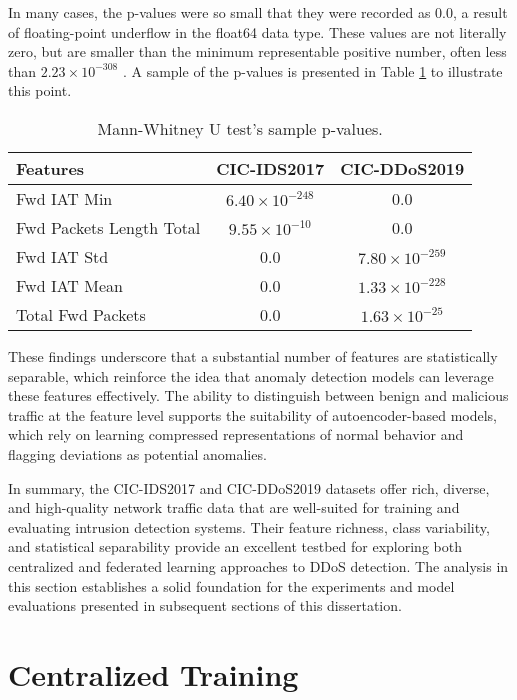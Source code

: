 In many cases, the p-values were so small that they were recorded as 0.0, a result of floating-point underflow in the float64 data type. These values are not literally zero, but are smaller than the minimum representable positive number, often less than $2.23 \times 10^{-308}$ \citep{w3floatnum}. A sample of the p-values is presented in Table \ref{tbl:mannwhitneyu_results} to illustrate this point.

\begin{table}[h]
    \caption{Mann-Whitney U test’s sample p-values.}
    \centering
    \begin{tabular}{l|c|c}
        Features & CIC-IDS2017 & CIC-DDoS2019 \\
        \hline\hline
        Fwd IAT Min  & $6.40 \times 10^{-248}$ & 0.0 \\
        Fwd Packets Length Total  & $9.55 \times 10^{-10}$ & 0.0 \\
        Fwd IAT Std  & 0.0 & $7.80 \times 10^{-259}$ \\
        Fwd IAT Mean  & 0.0 & $1.33 \times 10^{-228}$ \\
        Total Fwd Packets  & 0.0 & $1.63 \times 10^{-25}$ \\
    \end{tabular}
    \label{tbl:mannwhitneyu_results}
\end{table}

These findings underscore that a substantial number of features are statistically separable, which reinforce the idea that anomaly detection models can leverage these features effectively. The ability to distinguish between benign and malicious traffic at the feature level supports the suitability of autoencoder-based models, which rely on learning compressed representations of normal behavior and flagging deviations as potential anomalies.

In summary, the CIC-IDS2017 and CIC-DDoS2019 datasets offer rich, diverse, and high-quality network traffic data that are well-suited for training and evaluating intrusion detection systems. Their feature richness, class variability, and statistical separability provide an excellent testbed for exploring both centralized and federated learning approaches to DDoS detection. The analysis in this section establishes a solid foundation for the experiments and model evaluations presented in subsequent sections of this dissertation.

\section{Centralized Training}

